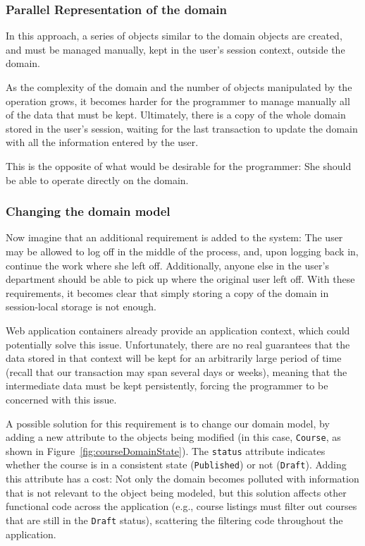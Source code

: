\documentclass{llncs}
\begin{document}
\subsubsection{Parallel Representation of the domain}

In this approach, a series of objects similar to the domain objects
are created, and must be managed manually, kept in the user's session
context, outside the domain.

As the complexity of the domain and the number of objects manipulated
by the operation grows, it becomes harder for the programmer to manage
manually all of the data that must be kept. Ultimately, there is a
copy of the whole domain stored in the user's session, waiting for the
last transaction to update the domain with all the information entered
by the user.

This is the opposite of what would be desirable for the programmer:
She should be able to operate directly on the domain.

\subsubsection{Changing the domain model}

Now imagine that an additional requirement is added to the system: The
user may be allowed to log off in the middle of the process, and, upon
logging back in, continue the work where she left off. Additionally,
anyone else in the user's department should be able to pick up where
the original user left off. With these requirements, it becomes clear
that simply storing a copy of the domain in session-local storage is
not enough.

Web application containers already provide an application context,
which could potentially solve this issue. Unfortunately, there are no
real guarantees that the data stored in that context will be kept for
an arbitrarily large period of time (recall that our transaction may
span several days or weeks), meaning that the intermediate data must
be kept persistently, forcing the programmer to be concerned with this
issue.

A possible solution for this requirement is to change our domain
model, by adding a new attribute to the objects being modified (in
this case, \texttt{Course}, as shown in
Figure~\ref{fig:courseDomainState}). The \texttt{status} attribute
indicates whether the course is in a consistent state
(\texttt{Published}) or not (\texttt{Draft}). Adding this attribute
has a cost: Not only the domain becomes polluted with information that
is not relevant to the object being modeled, but this solution affects
other functional code across the application (e.g., course listings
must filter out courses that are still in the \texttt{Draft} status),
scattering the filtering code throughout the application.
\end{document}

